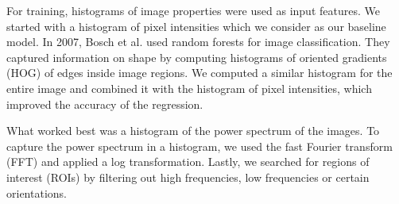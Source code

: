 \documentclass[10pt,conference,compsocconf]{IEEEtran}
\begin{document}
For training, histograms of image properties were used as input features. We started with a histogram of pixel intensities which we consider as our baseline model. In 2007, Bosch et al.\@ \cite{Bosch} used random forests for image classification. They captured information on shape by computing histograms of oriented gradients (HOG) of edges inside image regions. We computed a similar histogram for the entire image and combined it with the histogram of pixel intensities, which improved the accuracy of the regression.

What worked best was a histogram of the power spectrum of the images. To capture the power spectrum in a histogram, we used the fast Fourier transform (FFT) and applied a log transformation. Lastly, we searched for regions of interest (ROIs) by filtering out high frequencies, low frequencies or certain orientations.
\end{document}
